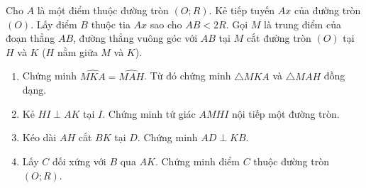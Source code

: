 \begin{ex}%
	Cho $A$ là một điểm thuộc đường tròn $(O;R)$. Kẻ tiếp tuyến $Ax$ của đường tròn $(O)$. Lấy điểm $B$ thuộc tia $Ax$ sao cho $AB <2R$. Gọi $M$ là trung điểm của đoạn thẳng $AB$, đường thẳng vuông góc với $AB$ tại $M$ cắt đường tròn $(O)$ tại $H$ và $K$ ($H$ nằm giữa $M$ và $K$).
	\begin{enumerate}
		\item Chứng minh $\widehat{MKA} =\widehat{MAH}$. Từ đó chứng minh $\triangle MKA$ và $\triangle MAH$ đồng dạng.
		\item Kẻ $HI \perp AK $ tại $I$. Chứng minh tứ giác $AMHI$ nội tiếp một đường tròn.
		\item Kéo dài $AH$ cắt $BK$ tại $D$. Chứng minh $AD \perp KB$.
		\item Lấy $C$ đối xứng với $B$ qua $AK$. Chứng minh điểm $C$ thuộc đường tròn $(O;R)$.
	\end{enumerate}
\end{ex}
